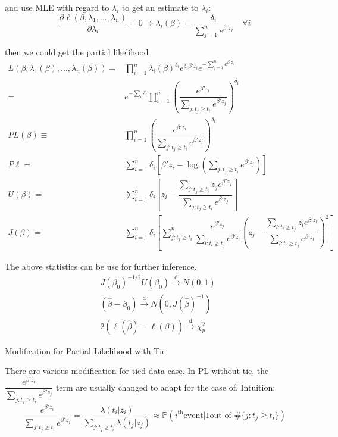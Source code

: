 and use MLE with regard to $ \lambda _i $ to get an estimate to $ \lambda _i $: 
\begin{equation}
    \dfrac{\partial^{} \ell(\beta ,\lambda _1,\ldots,\lambda _n)}{\partial \lambda _i^{}}=0\Rightarrow \lambda _i(\beta )=\dfrac{\delta _i}{\sum_{j=1}^ne^{\beta 'z_j}} \quad \forall i
\end{equation}

then we could get the partial likelihood
\begin{align}
    L(\beta ,\lambda _1(\beta ),\ldots,\lambda _n(\beta ))=&\prod_{i=1}^n\lambda _i(\beta )^{\delta _i}e^{\delta _i\beta 'z_i}e^{-\sum_{j=1}^ne^{\beta 'z_i}}\\
    =&e^{-\sum_i\delta _i}\prod_{i=1}^n\left( \dfrac{e^{\beta 'z_i}}{\sum_{j:t_j\geq t_i}e^{\beta 'z_j}} \right)^{\delta _i}\\
    PL(\beta )\equiv&\prod_{i=1}^n\left( \dfrac{e^{\beta 'z_i}}{\sum_{j:t_j\geq t_i}e^{\beta 'z_j}} \right)^{\delta_i}\\
    P\ell=&\sum_{i=1}^n\delta _i\left[ \beta 'z_i-\log\left(\sum_{j:t_j\geq t_i}e^{\beta 'z_j}\right) \right]\\
    U(\beta )=&\sum_{i=1}^n\delta _i\left[ z_i-\dfrac{\sum_{j:t_j\geq t_i}z_je^{\beta 'z_j}}{\sum_{j:t_j\geq t_i}e^{\beta 'z_j}} \right]\\
    J(\beta )=&\sum_{i=1}^n\delta _i\left[ \sum_{j:t_j\geq t_i}^n \dfrac{e^{\beta 'z_j}}{\sum_{l:t_l\geq t_j}e^{\beta 'z_l}} \left( z_j-\dfrac{\sum_{l:t_l\geq t_j}z_le^{\beta 'z_l}}{\sum_{l:t_l\geq t_j}e^{\beta 'z_l}} \right)^2 \right]
\end{align}

The above statistics can be use for further inference.
\begin{align}
    &J(\beta _0)^{-1/2}U(\beta _0)\xrightarrow[]{\mathrm{d}} N(0,1)\\
    &(\hat{\beta }-\beta _0)\xrightarrow[]{\mathrm{d}} N(0,J(\hat{\beta })^{-1})\\
    &2(\ell(\hat{\beta })-\ell(\beta))\xrightarrow[]{\mathrm{d}} \chi^2_p
\end{align}

\begin{point}
    Modification for Partial Likelihood with Tie
\end{point}

There are various modification for tied data case. In PL without tie, the $ \dfrac{e^{\beta 'z_i}}{\sum_{j:t_j\geq t_i}e^{\beta 'z_j}} $ term are usually changed to adapt for the case of. Intuition:
\begin{equation}
    \dfrac{e^{\beta 'z_i}}{\sum_{j:t_j\geq t_i}e^{\beta 'z_j}}=\dfrac{\lambda (t_i|z_i)}{\sum_{j:t_j\geq t_i}\lambda (t_j|z_j)}\approx \mathbb{P}\left( i^\mathrm{th} \text{event}|1\text{out of }\# \{j:t_j\geq t_i\}  \right) 
\end{equation}

